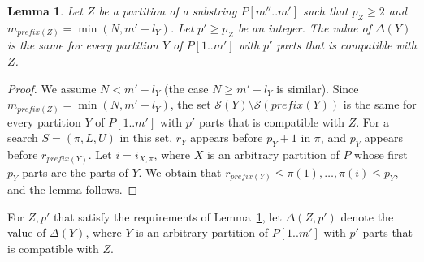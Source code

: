 \documentclass[12pt]{article}
\newtheorem{lemma}[theorem]{Lemma}
\newcommand{\substr}[3]{#1[#2..#3]}
\newcommand{\scheme}{\mathcal{S}}
\newcommand{\partition}{X}
\newcommand{\lognc}{N}
\newcommand{\ppartition}{Y}
\newcommand{\spartition}{Z}
\newcommand{\plen}[1]{m_{#1}}
\newcommand{\plast}[1]{l_{#1}}
\newcommand{\pnumparts}[1]{p_{#1}}
\newcommand{\prank}[1]{r_{#1}}
\newcommand{\pprefix}[1]{\mathit{prefix}(#1)}
\begin{document}
\begin{lemma}\label{lem:optimal-2}
Let $\spartition$ be a partition of a substring $\substr{P}{m''}{m'}$
such that $\pnumparts{\spartition} \geq 2$ and
$\plen{\pprefix{\spartition}} = \min(\lognc,m'-\plast{\ppartition})$.
Let $p'\geq \pnumparts{\spartition}$ be an integer.
The value of $\Delta(\ppartition)$ is the same for
every partition $\ppartition$ of $\substr{P}{1}{m'}$ with $p'$ parts
that is compatible with $\spartition$.
\end{lemma}
\begin{proof}
We assume $\lognc < m'-\plast{\ppartition}$ (the case
$\lognc \geq m'-\plast{\ppartition}$ is similar).
Since $\plen{\pprefix{\spartition}} = \min(\lognc,m'-\plast{\ppartition})$,
the set $\scheme(\ppartition)\setminus\scheme(\pprefix{\ppartition})$ is the
same for every partition $\ppartition$ of $\substr{P}{1}{m'}$ with $p'$ parts
that is compatible with $\spartition$.
For a search $S=(\pi,L,U)$ in this set, $\prank{\ppartition}$ appears before
$\pnumparts{\ppartition}+1$ in $\pi$,
and $\pnumparts{\ppartition}$ appears before $\prank{\pprefix{\ppartition}}$.
Let $i = i_{\partition,\pi}$, 
where $\partition$ is an arbitrary partition of $P$ whose first
$\pnumparts{\ppartition}$ parts are the parts of $\ppartition$.
We obtain that 
$\prank{\pprefix{\ppartition}} \leq
\pi(1),\ldots,\pi(i) \leq \pnumparts{\ppartition}$,
and the lemma follows.
\end{proof}

For $\spartition,p'$ that satisfy the requirements of
Lemma~\ref{lem:optimal-2}, let $\Delta(\spartition,p')$ denote the value of
$\Delta(\ppartition)$, where $\ppartition$ is an arbitrary partition of
$\substr{P}{1}{m'}$ with $p'$ parts that is compatible with $\spartition$.
\end{document}
